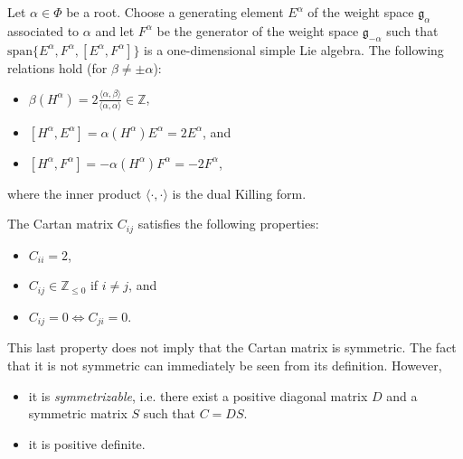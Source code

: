     \begin{property}
        Let $\alpha\in\Phi$ be a root. Choose a generating element $E^\alpha$ of the weight space $\mathfrak{g}_\alpha$ associated to $\alpha$ and let $F^\alpha$ be the generator of the weight space $\mathfrak{g}_{-\alpha}$ such that $\text{span}\{E^\alpha,F^\alpha,[E^\alpha,F^\alpha]\}$ is a one-dimensional simple Lie algebra. The following relations hold (for $\beta\neq\pm\alpha$):
        \begin{itemize}
            \item $\beta(H^\alpha) = 2\frac{\langle\alpha, \beta\rangle}{\langle\alpha, \alpha\rangle}\in\mathbb{Z}$,
            \item $[H^\alpha,E^\alpha] = \alpha(H^\alpha)E^\alpha = 2E^\alpha$, and
            \item $[H^\alpha,F^\alpha] = -\alpha(H^\alpha)F^\alpha = -2F^\alpha$,
        \end{itemize}
        where the inner product $\langle\cdot,\cdot\rangle$ is the dual Killing form.
    \end{property}

    \begin{property}\label{lie:cartan_prop}
        The Cartan matrix $C_{ij}$ satisfies the following properties:
        \begin{itemize}
            \item $C_{ii}=2$,
            \item $C_{ij}\in\mathbb{Z}_{\leq0}$ if $i\neq j$, and
            \item $C_{ij}=0\iff C_{ji}=0$.
        \end{itemize}
        This last property does not imply that the Cartan matrix is symmetric. The fact that it is not symmetric can immediately be seen from its definition. However,
        \begin{itemize}
            \item it is \textit{symmetrizable}, i.e. there exist a positive diagonal matrix $D$ and a symmetric matrix $S$ such that $C=DS$.
            \item it is positive definite.
        \end{itemize}
    \end{property}

